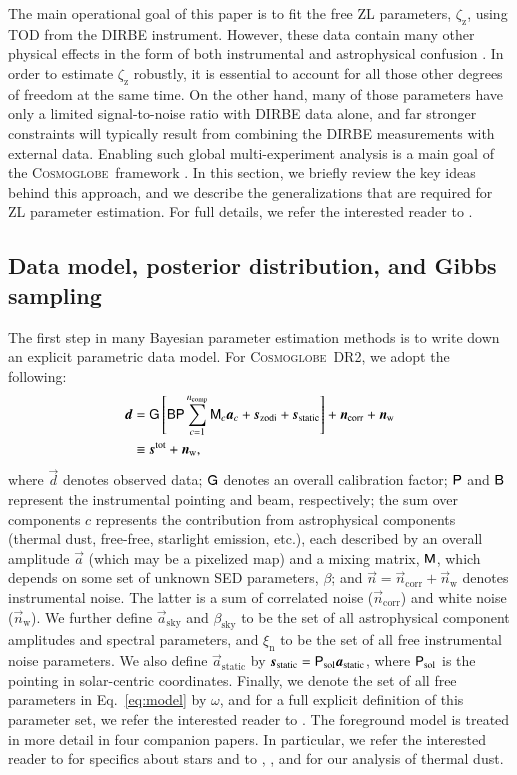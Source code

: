 \documentclass[twocolumn]{aa}
\newcommand{\dv}[0]{\vec{d}}
\newcommand{\B}[0]{\tens{B}}
\newcommand{\G}[0]{\tens{G}}
\newcommand{\n}[0]{\vec{n}}
\newcommand{\s}[0]{\vec{s}}
\renewcommand{\a}[0]{\vec{a}}
\newcommand{\M}[0]{\tens{M}}
\renewcommand{\P}[0]{\tens{P}}
\newcommand{\cosmoglobe}{\textsc{Cosmoglobe}}
\begin{document}
The main operational goal of this paper is to fit the free ZL
parameters, $\zeta_{\mathrm{z}}$, using TOD from the
DIRBE instrument. However, these data contain many other physical
effects in the form of both instrumental and astrophysical confusion
\citep[e.g.,][]{hauser1998,arendt1998}. In order to estimate
$\zeta_{\mathrm{z}}$ robustly, it is essential to account for all
those other degrees of freedom at the same time. On the other hand,
many of those parameters have only a limited signal-to-noise ratio
with DIRBE data alone, and far stronger constraints will typically
result from combining the DIRBE measurements with external
data. Enabling such global multi-experiment analysis is a main goal of
the \cosmoglobe\ framework \citep{Watts2023}. In this section, we briefly review the key
ideas behind this approach, and we describe the generalizations that
are required for ZL parameter estimation. For full details, we refer
the interested reader to \citet{CG02_01}. 


\subsection{Data model, posterior distribution, and Gibbs sampling}
\label{sec:gibbs}

The first step in many Bayesian parameter estimation methods is to
write down an explicit parametric data model. For \cosmoglobe\ DR2, we
adopt the following:
\begin{align}
	\label{eq:model}
	\dv &=\G\left[\B\P\sum_{c=1}^{n_{\mathrm{comp}}}\M_c\a_c+\s_{\mathrm{zodi}} +
          \s_{\mathrm{static}}\right] + \n_\mathrm{corr} + \n_\mathrm{w} \nonumber\\
        &\equiv \s^{\mathrm{tot}} + \n_\mathrm{w},
\end{align}
where $\dv$ denotes observed data; $\G$ denotes an overall calibration
factor; $\P$ and $\B$ represent the instrumental pointing and beam,
respectively; the sum over components $c$ represents the contribution
from astrophysical components (thermal dust, free-free, starlight
emission, etc.), each described by an overall amplitude $\a$ (which may be a
pixelized map) and a mixing matrix, $\M$, which depends on some set of
unknown SED parameters, $\beta$; and $\n=\n_\mathrm{corr} + \n_\mathrm{w}$ denotes instrumental
noise. The latter is a sum of correlated noise ($\n_\mathrm{corr}$) and white noise ($\n_\mathrm{w}$). 
We further define $\a_{\mathrm{sky}}$ and
$\beta_{\mathrm{sky}}$ to be the set of all astrophysical component
amplitudes and spectral parameters, and $\xi_{\mathrm{n}}$ to be the
set of all free instrumental noise parameters. We also define
$\a_{\mathrm{static}}$ by
$\s_{\mathrm{static}}=\P_{\mathrm{sol}}\a_{\mathrm{static}}$, where
$\P_{\mathrm{sol}}$ is the pointing in solar-centric
coordinates. Finally, we denote the set of all free parameters in
Eq.~\eqref{eq:model} by $\omega$, and for a full explicit definition
of this parameter set, we refer the interested reader to
\citet{CG02_01}. The foreground model is treated in more 
detail in four companion papers. In particular, we refer the interested reader 
to \citet{CG02_04} for specifics about stars and to \citet{CG02_05}, \citet{CG02_06}, and \citet{CG02_07} 
for our analysis of thermal dust.
\end{document}
